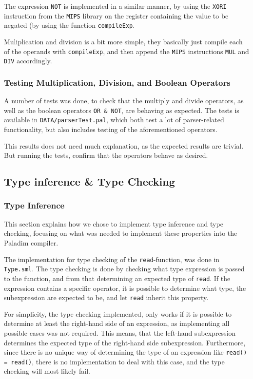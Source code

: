 \documentclass[10pt]{article}
\begin{document}
The expression \texttt{NOT} is implemented in a similar manner, by using the \texttt{XORI} instruction from the \texttt{MIPS} library on the register containing the value to be negated (by using the function \texttt{compileExp}.

Muliplication and division is a bit more simple, they basically just compile each of the operands with \texttt{compileExp}, and then append the \texttt{MIPS} instructions \texttt{MUL} and \texttt{DIV} accordingly.

\subsubsection{Testing Multiplication, Division, and Boolean Operators}
A number of tests was done, to check that the multiply and divide operators, as well as the boolean operators \texttt{OR \& NOT}, are behaving as expected. The tests is available in \texttt{DATA/parserTest.pal}, which both test a lot of parser-related functionality, but also includes testing of the aforementioned operators.

This results does not need much explanation, as the expected results are trivial. But running the tests, confirm that the operators behave as desired.

\subsection{Type inference \& Type Checking}
\subsubsection{Type Inference}
This section explains how we chose to implement type inference and type checking, focusing on what was needed to implement these properties into the Paladim compiler.

The implementation for type checking of the \texttt{read}-function, was done in \texttt{Type.sml}. The type checking is done by checking what type expression is passed to the function, and from that determining an expected type of \texttt{read}. If the expression contains a specific operator, it is possible to determine what type, the subexpression are expected to be, and let \texttt{read} inherit this property.

For simplicity, the type checking implemented, only works if it is possible to determine at least the right-hand side of an expression, as implementing all possible cases was not required. This means, that the left-hand subexpression determines the expected type of the right-hand side subexpression. Furthermore, since there is no unique way of determining the type of an expression like \texttt{read() = read()}, there is no implementation to deal with this case, and the type checking will most likely fail.
\end{document}
